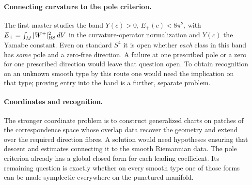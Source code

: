 \documentclass[11pt,letterpaper]{article}
\numberwithin{equation}{section}
\begin{document}
\paragraph{Connecting curvature to the pole criterion.}
The first master \cite{Baker2026ChiralMaster} studies the band
\(Y(c)>0\), \(E_+(c)<8\pi^2\), with
\(E_+=\int_M |W^+|_{\rm HS}^2\,dV\) in the curvature-operator
normalization and \(Y(c)\) the Yamabe constant. Even on standard
\(S^4\) it is open whether \emph{each} class in this band has
\emph{some} pole and a zero-free direction. A failure at one
prescribed pole or a zero for one prescribed direction would leave
that question open. To obtain recognition on an unknown smooth type
by this route one would need the implication on that type; proving
entry into the band is a further, separate problem.

\paragraph{Coordinates and recognition.}
The stronger coordinate problem is to construct generalized charts
on patches of the correspondence space whose overlap data recover the
geometry and extend over the required direction fibres. A solution
would need hypotheses ensuring that descent and estimates connecting
it to the smooth Riemannian data. The pole criterion already has a
global closed form for each leading coefficient. Its remaining
question is exactly whether on every smooth type one of those forms
can be made symplectic everywhere on the punctured manifold.



\end{document}

